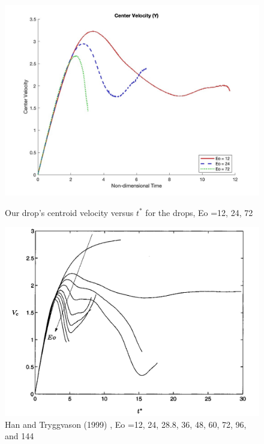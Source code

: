 \documentclass[12pt]{article}
\begin{document}
\begin{figure}[H]
    \centering
    \begin{minipage}{0.45\textwidth}
        \centering
        \includegraphics[width=\textwidth]{Latex/figures/velocity_profile_compare.jpg}
        \caption{Our drop's centroid velocity versus $t^*$ for the drops, Eo =12, 24, 72}
        \label{fig:deformation1}
    \end{minipage}
    \hspace{0.05\textwidth}
    \begin{minipage}{0.45\textwidth}
        \centering
        \includegraphics[width=\textwidth]{Latex/figures/Trygg_allEo_velo.jpeg}
        \caption{Han and Tryggvason (1999) \cite{han1999axisymmetric}, Eo =12, 24, 28.8, 36, 48, 60, 72, 96, and 144}
        \label{fig:deformation2}
    \end{minipage}
\end{figure}
\end{document}
